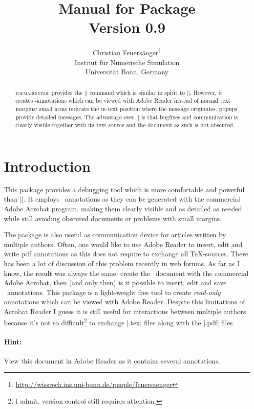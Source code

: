 \documentclass[a4paper]{ltxdoc}
\author{%
	Christian Feuers\"anger\footnote{\url{http://wissrech.ins.uni-bonn.de/people/feuersaenger}}\\%
	Institut f\"ur Numerische Simulation\\
	Universit\"at Bonn, Germany}
\title{
	Manual for Package \PDFMRG\\
	{\small Version 0.9}}
\newcommand\PDFMRG{\textsc{pdfmarginpar}}
\begin{document}
\maketitle
\begin{abstract}%
\PDFMRG\ provides the |\pdfmarginpar| command which is similar in spirit to |\marginpar|. However, it creates \pdf-annotations which can be viewed with Adobe Reader instead of normal text margins: small icons indicate the in-text position where the message originates, popups provide detailed messages. The advantage over |\marginpar| is that bugfixes and communication is clearly visible together with its text source and the document as such is not obscured.
\end{abstract}
\tableofcontents
\section{Introduction}
This package provides a debugging tool which is more comfortable and powerful than |\marginpar|. It employs \pdf\ annotations as they can be generated with the commercial Adobe Acrobat program, making them clearly visible and as detailed as needed while still avoiding obscured documents or problems with small margins.

The package is also useful as communication device for articles written by multiple authors. Often, one would like to use Adobe Reader to insert, edit and write pdf annotations as this does not require to exchange all \TeX-sources. There has been a lot of discussion of this problem recently in web forums. As far as I know, the result was always the same: create the \pdf\ document with the commercial Adobe Acrobat, then (and only then) is it possible to insert, edit and save \pdf\ annotations. This package is a light-weight free tool to create \emph{read-only} annotations which can be viewed with Adobe Reader. Despite this limitations of Acrobat Reader I guess it is still useful for interactions between multiple authors because it's not so difficult\footnote{I admit, version control still requires attention.} to exchange |.tex| files along with the |.pdf| files.

\paragraph{Hint:} View this document in Adobe Reader as it contains several annotations.
\end{document}
